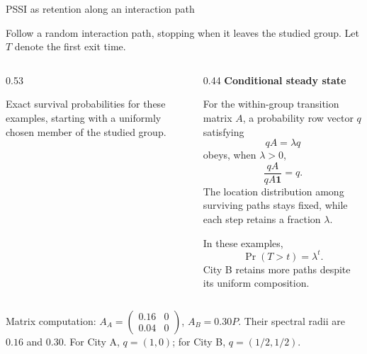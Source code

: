 \documentclass[aspectratio=169,10pt]{beamer}
\begin{document}
\begin{frame}[shrink=0]{PSSI as retention along an interaction path}
\small

Follow a random interaction path, stopping when it leaves
the studied group. Let $T$ denote the first exit time.

\begin{columns}[T,onlytextwidth]

\begin{column}{0.53\textwidth}
\centering
{}

{\scriptsize
Exact survival probabilities for these examples,
starting with a uniformly chosen member of the studied group.
}
\end{column}

\begin{column}{0.44\textwidth}
\textbf{Conditional steady state}

For the within-group transition matrix $A$, a probability
row vector $q$ satisfying
\[
    qA=\lambda q
\]
obeys, when $\lambda>0$,
\[
    \frac{qA}{qA\mathbf{1}}=q.
\]
The location distribution among surviving paths stays
fixed, while each step retains a fraction $\lambda$.

\medskip
In these examples,
\[
    \Pr(T>t)=\lambda^t.
\]
City B retains more paths despite its uniform composition.
\end{column}

\end{columns}

\medskip
{\scriptsize
Matrix computation:
$A_A=\left(\begin{smallmatrix}0.16&0\\0.04&0\end{smallmatrix}\right)$,
$A_B=0.30P$.
Their spectral radii are $0.16$ and $0.30$.
For City A, $q=(1,0)$; for City B, $q=(1/2,1/2)$.
}

\end{frame}
\end{document}
